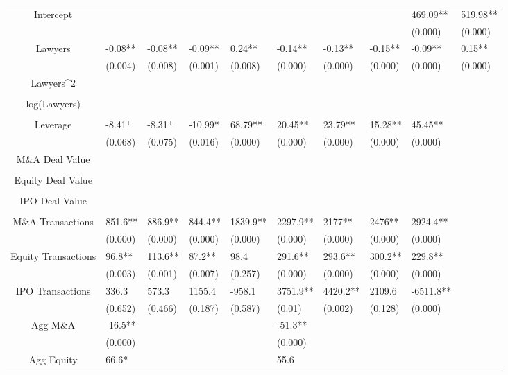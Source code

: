 \documentclass{article}
\begin{document}
\begin{table}[H]
\begin{tabular}{|clllllllll|}
Intercept &  &  &  &  &  &  &  & 469.09** & 519.98** \\ 
   &  &  &  &  &  &  &  & (0.000) & (0.000) \\ 
  Lawyers & -0.08** & -0.08** & -0.09** & 0.24** & -0.14** & -0.13** & -0.15** & -0.09** & 0.15** \\ 
   & (0.004) & (0.008) & (0.001) & (0.008) & (0.000) & (0.000) & (0.000) & (0.000) & (0.000) \\ 
  Lawyers^2 &  &  &  &  &  &  &  &  &  \\ 
   &  &  &  &  &  &  &  &  &  \\ 
  log(Lawyers) &  &  &  &  &  &  &  &  &  \\ 
   &  &  &  &  &  &  &  &  &  \\ 
  Leverage & -8.41$^{+}$ & -8.31$^{+}$ & -10.99* & 68.79** & 20.45** & 23.79** & 15.28** & 45.45** &  \\ 
   & (0.068) & (0.075) & (0.016) & (0.000) & (0.000) & (0.000) & (0.000) & (0.000) &  \\ 
  M\&A Deal Value &  &  &  &  &  &  &  &  &  \\ 
   &  &  &  &  &  &  &  &  &  \\ 
  Equity Deal Value &  &  &  &  &  &  &  &  &  \\ 
   &  &  &  &  &  &  &  &  &  \\ 
  IPO Deal Value &  &  &  &  &  &  &  &  &  \\ 
   &  &  &  &  &  &  &  &  &  \\ 
  M\&A Transactions & 851.6** & 886.9** & 844.4** & 1839.9** & 2297.9** & 2177** & 2476** & 2924.4** &  \\ 
   & (0.000) & (0.000) & (0.000) & (0.000) & (0.000) & (0.000) & (0.000) & (0.000) &  \\ 
  Equity Transactions & 96.8** & 113.6** & 87.2** & 98.4 & 291.6** & 293.6** & 300.2** & 229.8** &  \\ 
   & (0.003) & (0.001) & (0.007) & (0.257) & (0.000) & (0.000) & (0.000) & (0.000) &  \\ 
  IPO Transactions & 336.3 & 573.3 & 1155.4 & -958.1 & 3751.9** & 4420.2** & 2109.6 & -6511.8** &  \\ 
   & (0.652) & (0.466) & (0.187) & (0.587) & (0.01) & (0.002) & (0.128) & (0.000) &  \\ 
  Agg M\&A & -16.5** &  &  &  & -51.3** &  &  &  &  \\ 
   & (0.000) &  &  &  & (0.000) &  &  &  &  \\ 
  Agg Equity & 66.6* &  &  &  & 55.6 &  &  &  &  \\ 

\end{tabular}
\end{table}
\end{document}
